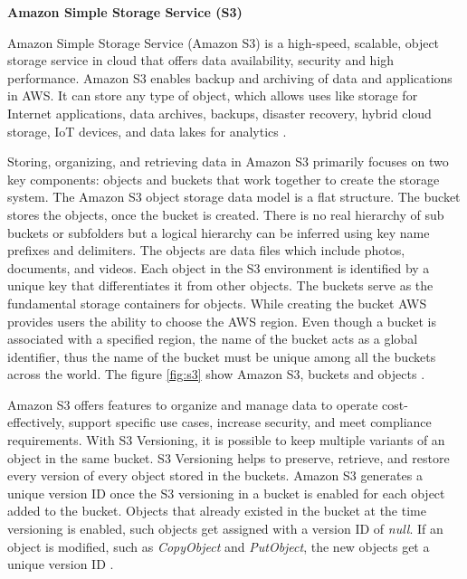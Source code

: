 {\textbf{Amazon Simple Storage Service (S3)}

\par Amazon Simple Storage Service (Amazon S3) is a high-speed, scalable, object storage service in cloud that offers data availability, security and high performance.
Amazon S3 enables backup and archiving of data and applications in AWS. It can store any type of object, which allows uses like storage for Internet applications, data archives, backups, disaster recovery, hybrid cloud storage, IoT devices, and data lakes for analytics \cite{36}.

\par Storing, organizing, and retrieving data in Amazon S3 primarily focuses on two key components: objects and buckets that work together to create the storage system.
The Amazon S3 object storage data model is a flat structure.
The bucket stores the objects, once the bucket is created.
There is no real hierarchy of sub buckets or subfolders but a logical hierarchy can be inferred using key name prefixes and delimiters.
The objects are data files which include photos, documents, and videos. Each object in the S3 environment is identified by a unique key that differentiates it from other objects. The buckets serve as the fundamental storage containers for objects. While creating the bucket AWS provides users the ability to choose the AWS region. Even though a bucket is associated with a specified region, the name of the bucket acts as a global identifier, thus the name of the bucket must be unique among all the buckets across the world. The figure \ref{fig:s3} show Amazon S3, buckets and objects \cite{37}.

\par Amazon S3 offers features to organize and manage data to operate cost-effectively, support specific use cases,
increase security, and meet compliance requirements.
With S3 Versioning, it is possible to keep multiple variants of an object in the same bucket.
S3 Versioning helps to preserve, retrieve, and restore every version of every object stored in the buckets.
Amazon S3 generates a unique version ID once the S3 versioning in a bucket is enabled for each object added to the bucket.
Objects that already existed in the bucket at the time versioning is enabled, such objects get assigned with a version ID of \textit{null}. If an object is modified, such as \textit{CopyObject} and \textit{PutObject}, the new objects get a unique version ID \cite{72}.

}

